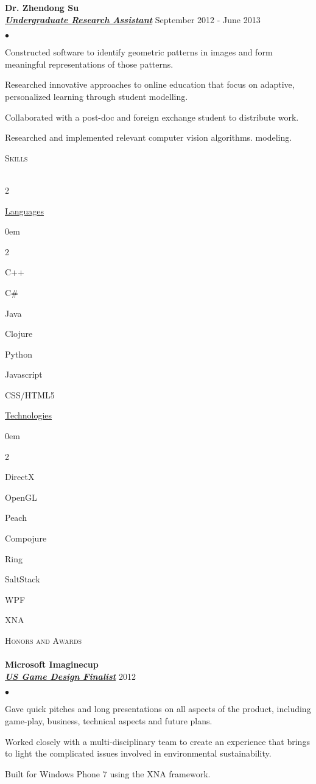 \documentclass{article}
\newcommand{\lineunder}{\vspace*{-8pt} \\ \hspace*{-18pt} \hrulefill \\}
\newcommand{\header}[1]{{\hspace*{-15pt}\vspace*{6pt} \textsc{#1}} \vspace*{-6pt} \lineunder}
\newcommand{\employer}[3]{{ \textbf{#1} \\ \underline{\textbf{\emph{#3}}} \hfill #2\\  }}
\newenvironment{achievements}{\begin{list}{$\bullet$}{\topsep 0pt \itemsep -2pt}}{\vspace*{4pt}\end{list}}
\begin{document}
\employer{Dr. Zhendong Su}{September 2012 - June 2013} {Undergraduate
  Research Assistant}
\begin{achievements}
\item Constructed software to identify geometric patterns in
  images and form meaningful representations of those patterns.
\item Researched innovative approaches to online education that
  focus on adaptive, personalized learning through student modelling.
\item Collaborated with a post-doc and foreign exchange student to distribute work.
\item Researched and implemented relevant computer vision algorithms.
  modeling. 
\end{achievements}

\header{Skills}
\begin{multicols}{2}
  
\underline{Languages}
\begin{itemize}\itemsep0em
\begin{multicols}{2}
\item C++
\item C\#
\item Java
\item Clojure
\item Python
\item Javascript
\item CSS/HTML5
\end{multicols}
\end{itemize}
\columnbreak

\underline{Technologies}
\begin{itemize}\itemsep0em
\begin{multicols}{2}
\item DirectX
\item OpenGL
\item Peach
\item Compojure
\item Ring
\item SaltStack
\item WPF
\item XNA
\end{multicols}
\end{itemize}
\end{multicols}

\vspace*{-8pt}
\header{Honors and Awards}
\employer{Microsoft Imaginecup}{2012}{US Game Design Finalist}
\begin{achievements}
\item Gave quick pitches and long presentations on all aspects of the
  product, including game-play, business, technical aspects and future plans.
\item Worked closely with a multi-disciplinary team to create an
  experience that brings to light the complicated issues involved in
  environmental sustainability.
\item Built for Windows Phone 7 using the XNA framework.
\end{achievements}
\end{document}
